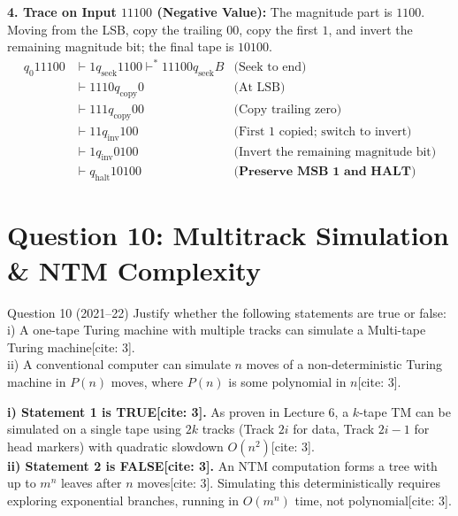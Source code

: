 \documentclass[11pt,a4paper]{article}
\begin{document}
\begin{solutionbox}
\begin{center}
\end{center}

\textbf{4. Trace on Input $11100$ (Negative Value):}
The magnitude part is $1100$. Moving from the LSB, copy the trailing $00$, copy the first $1$, and invert the remaining magnitude bit; the final tape is $10100$.
$$
\begin{array}{rll}
q_0 11100 & \vdash 1q_{\text{seek}}1100 \vdash^* 11100q_{\text{seek}}B & \text{(Seek to end)} \\
& \vdash 1110q_{\text{copy}}0 & \text{(At LSB)} \\
& \vdash 111q_{\text{copy}}00 & \text{(Copy trailing zero)} \\
& \vdash 11q_{\text{inv}}100 & \text{(First 1 copied; switch to invert)} \\
& \vdash 1q_{\text{inv}}0100 & \text{(Invert the remaining magnitude bit)} \\
& \vdash q_{\text{halt}}10100 & \textbf{(Preserve MSB 1 and HALT)}
\end{array}
$$
\end{solutionbox}

\section{Question 10: Multitrack Simulation \& NTM Complexity}
\begin{questionbox}{Question 10 (2021--22)}
Justify whether the following statements are true or false: \\
i) A one-tape Turing machine with multiple tracks can simulate a Multi-tape Turing machine[cite: 3]. \\
ii) A conventional computer can simulate $n$ moves of a non-deterministic Turing machine in $P(n)$ moves, where $P(n)$ is some polynomial in $n$[cite: 3].
\end{questionbox}

\begin{solutionbox}
\textbf{i) Statement 1 is TRUE[cite: 3].} As proven in Lecture 6, a $k$-tape TM can be simulated on a single tape using $2k$ tracks (Track $2i$ for data, Track $2i-1$ for head markers) with quadratic slowdown $O(n^2)$[cite: 3]. \\
\textbf{ii) Statement 2 is FALSE[cite: 3].} An NTM computation forms a tree with up to $m^n$ leaves after $n$ moves[cite: 3]. Simulating this deterministically requires exploring exponential branches, running in $O(m^n)$ time, not polynomial[cite: 3].
\end{solutionbox}
\end{document}
